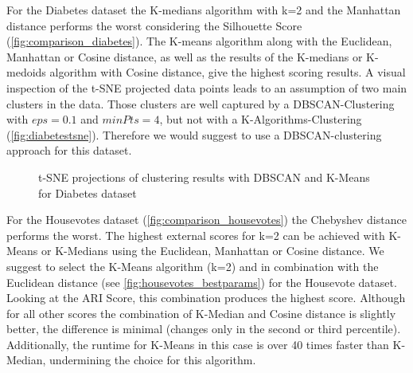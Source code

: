 For the Diabetes dataset the K-medians algorithm with k=2 and the Manhattan distance performs the worst considering the Silhouette Score (\autoref{fig:comparison_diabetes}). The K-means algorithm along with the Euclidean, Manhattan or Cosine distance, as well as the results of the K-medians or K-medoids algorithm with Cosine distance, give the highest scoring results. A visual inspection of the t-SNE projected data points leads to an assumption of two main clusters in the data. Those clusters are well captured by a DBSCAN-Clustering with $eps = 0.1$ and $minPts = 4$, but not with a K-Algorithms-Clustering (\autoref{fig:diabetestsne}). Therefore we would suggest to use a DBSCAN-clustering approach for this dataset. 

\begin{figure}[H]
	\centering
	\caption{t-SNE projections of clustering results with DBSCAN and K-Means for Diabetes dataset}
	\label{fig:diabetestsne}
\end{figure}
 

For the Housevotes dataset (\autoref{fig:comparison_housevotes}) the Chebyshev distance performs the worst. The highest external scores for k=2 can be achieved with K-Means or K-Medians using the Euclidean, Manhattan or Cosine distance. We suggest to select the K-Means algorithm (k=2) and in combination with the Euclidean distance (see \autoref{fig:housevotes_bestparams}) for the Housevote dataset. Looking at the ARI Score, this combination produces the highest score. Although for all other scores the combination of K-Median and Cosine distance is slightly better, the difference is minimal (changes only in the second or third percentile). Additionally, the runtime for K-Means in this case is over 40 times faster than K-Median, undermining the choice for this algorithm.

